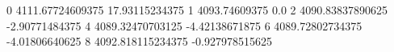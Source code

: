 0 4111.67724609375 17.93115234375
1 4093.74609375 0.0
2 4090.83837890625 -2.90771484375
4 4089.32470703125 -4.42138671875
6 4089.72802734375 -4.01806640625
8 4092.818115234375 -0.927978515625
